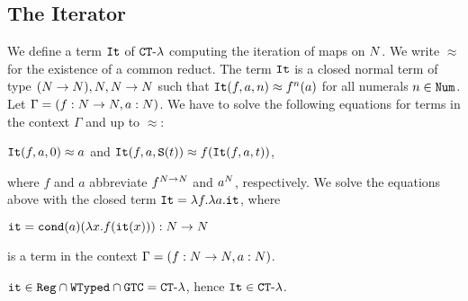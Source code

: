 \subsection{The Iterator}\label{subsection-iterator}
\begin{example}\label{example:iterator}
We define a term ${\tt It}$ of  ${ {\tt CT}\mbox{-}\lambda}$ computing the iteration of maps on ${N}$.
We write $\approx$ for
the existence of a common reduct.
The term ${\tt It}$ is a closed normal term of type $({N} \rightarrow {N}), {N},{N} \rightarrow {N}$ such 
that ${\tt It}(f,a,n) \approx f^n(a)$ for all numerals $n \in {\tt Num}$. 
Let $\Gamma = (f:{N} \rightarrow {N}, a:{N})$. 
We have to solve the following equations for terms in the context $\Gamma$
and up to $\approx$:
\begin{center}
  ${\tt It}(f,a,0) \approx a$
  \hspace{5ex}
  and
  \hspace{5ex}  
  ${\tt It}(f,a,{\tt S} (t)) \approx f({\tt It}(f,a,t))$,
\end{center}
where $f$ and $a$ abbreviate $f^{{N}\rightarrow{N}}$ and $a^{N}$, respectively.
We solve the equations above with the closed term ${\tt It} = \lambda f. \lambda a.{\tt it}$,
where 
\begin{center}
${\tt it} = {\tt cond} (a)(\lambda x.f({\tt it}(x))):{N} \rightarrow {N}$
\end{center}
is a term in the context $\Gamma = (f:{N} \rightarrow {N}, a:{N})$.
\end{example}

\begin{proposition}
\label{proposition-iterator-in-CT-lambda}
${\tt it} \in {\tt Reg} \cap {\tt WTyped} \cap {\tt GTC} = { {\tt CT}\mbox{-}\lambda}$, 
hence ${\tt It} \in { {\tt CT}\mbox{-}\lambda}$.
\end{proposition}


